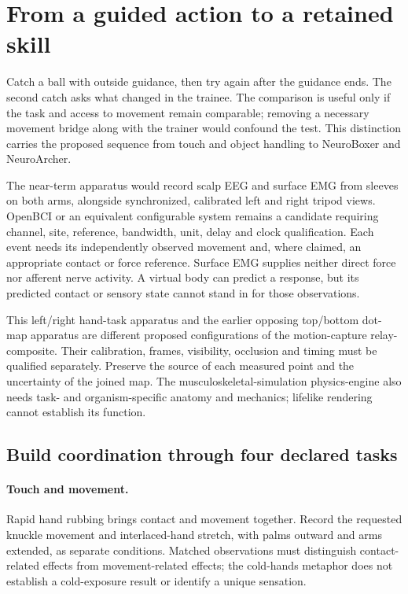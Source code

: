 \section{From a guided action to a retained skill}

Catch a ball with outside guidance, then try again after the guidance ends. The
second catch asks what changed in the trainee. The comparison is useful only if
the task and access to movement remain comparable; removing a necessary movement
bridge along with the trainer would confound the test. This distinction carries
the proposed sequence from touch and object handling to NeuroBoxer and NeuroArcher.

The near-term apparatus would record scalp EEG and surface EMG from sleeves on
both arms, alongside synchronized, calibrated left and right tripod views.
OpenBCI or an equivalent configurable system remains a candidate requiring
channel, site, reference, bandwidth, unit, delay and clock qualification. Each
event needs its independently observed movement and, where claimed, an
appropriate contact or force reference. Surface EMG supplies neither direct
force nor afferent nerve activity. A virtual body can predict a response, but
its predicted contact or sensory state cannot stand in for those observations.

This left/right hand-task apparatus and the earlier opposing top/bottom dot-map
apparatus are different proposed configurations of the motion-capture
relay-composite. Their calibration, frames, visibility, occlusion and timing
must be qualified separately. Preserve the source of each measured point and
the uncertainty of the joined map. The musculoskeletal-simulation physics-engine
also needs task- and organism-specific anatomy and mechanics; lifelike rendering
cannot establish its function.

\subsection{Build coordination through four declared tasks}

\paragraph{Touch and movement.}
Rapid hand rubbing brings contact and movement together. Record the requested
knuckle movement and interlaced-hand stretch, with palms outward and arms
extended, as separate conditions. Matched observations must distinguish
contact-related effects from movement-related effects; the cold-hands metaphor
does not establish a cold-exposure result or identify a unique sensation.

